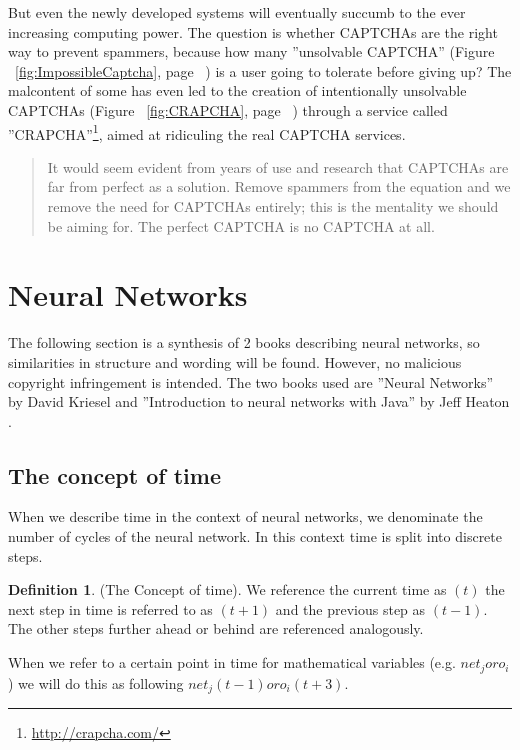 \documentclass[pdftex,a4paper,12pt,twoside]{report}
\theoremstyle{plain} \newtheorem{theorem}{Theorem} \newtheorem{proposition}{Proposition} \newtheorem{lemma}{Lemma} \newtheorem*{corollary}{Corollary}
\theoremstyle{definition} \newtheorem{definition}{Definition} \newtheorem{conjecture}{Conjecture} \newtheorem*{example}{Example} \newtheorem{algorithm}{Algorithm}
\theoremstyle{remark} \newtheorem*{remark}{Remark} \newtheorem*{note}{Note} \newtheorem{case}{Case}
\begin{document}
But even the newly developed systems will eventually succumb to the ever increasing computing power. The question is whether CAPTCHAs are the right way to prevent spammers, because how many ''unsolvable CAPTCHA'' (Figure ~\ref{fig:ImpossibleCaptcha}, page ~\pageref{fig:ImpossibleCaptcha}) is a user going to tolerate before giving up? The malcontent of some has even led to the creation of intentionally unsolvable CAPTCHAs (Figure ~\ref{fig:CRAPCHA}, page ~\pageref{fig:CRAPCHA}) through a service called ''CRAPCHA''\footnote{\url{http://crapcha.com/}}, aimed at ridiculing the real CAPTCHA services.
\begin{quote}
It would seem evident from years of use and research that CAPTCHAs are far from perfect as a solution. Remove spammers from the equation and we remove the need for CAPTCHAs entirely; this is the mentality we should be aiming for. The perfect CAPTCHA is no CAPTCHA at all.\citep{Bushell2011}
\end{quote}\newpage
\section{Neural Networks}
\label{sec:neuralnetworks}
The following section is a synthesis of 2 books describing neural networks, so similarities in structure and wording will be found. However, no malicious copyright infringement is intended. The two books used are ''Neural Networks'' by David Kriesel \citep{Kriesel2013} and ''Introduction to neural networks with Java'' by Jeff Heaton \citep{Heaton2005}.
\subsection{The concept of time}
When we describe time in the context of neural networks, we denominate the number of cycles of the neural network. In this context time is split into discrete steps.
\begin{definition}(The Concept of time). We reference the current time as $(t)$ the next step in time is referred to as $(t+1)$ and the previous step as $(t-1)$. The other steps further ahead or behind are referenced analogously. \end{definition} When we refer to a certain point in time for mathematical variables (e.g. $net_j or o_i$) we will do this as following $net_j(t-1) or o_i(t+3)$.
\end{document}
